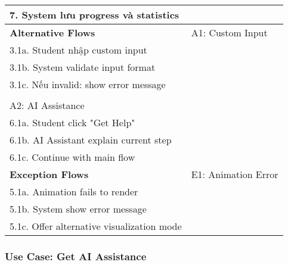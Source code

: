 \begin{table}[H]
\begin{tabularx}{\textwidth}{|l|X|}
7. System lưu progress và statistics \\ \hline
\textbf{Alternative Flows} & 
A1: Custom Input \\
\hspace{0.5cm} 3.1a. Student nhập custom input \\
\hspace{0.5cm} 3.1b. System validate input format \\
\hspace{0.5cm} 3.1c. Nếu invalid: show error message \\
\\
A2: AI Assistance \\
\hspace{0.5cm} 6.1a. Student click "Get Help" \\
\hspace{0.5cm} 6.1b. AI Assistant explain current step \\
\hspace{0.5cm} 6.1c. Continue with main flow \\ \hline
\textbf{Exception Flows} & 
E1: Animation Error \\
\hspace{0.5cm} 5.1a. Animation fails to render \\
\hspace{0.5cm} 5.1b. System show error message \\
\hspace{0.5cm} 5.1c. Offer alternative visualization mode \\ \hline
\end{tabularx}
\end{table}

\subsubsection{Use Case: Get AI Assistance}

